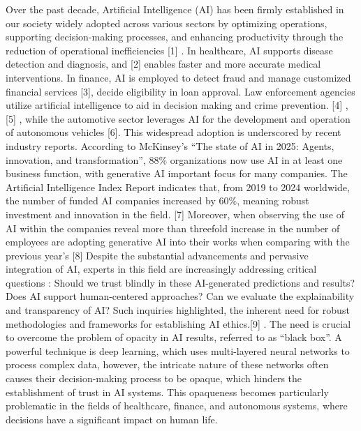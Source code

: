 Over the past decade, Artificial Intelligence (AI) has been firmly established in our society widely adopted across various sectors by optimizing operations, supporting decision-making processes, and enhancing productivity through the reduction of operational inefficiencies [1] \cite{Ali2023}. In healthcare, AI supports disease detection and diagnosis, and [2] \cite{PanForoughi2024} enables faster and more accurate medical interventions. In finance, AI is employed to detect fraud and manage customized financial services [3]\cite{OyeniyiEtAl2024}, decide eligibility in loan approval. Law enforcement agencies utilize artificial intelligence to aid in decision making and crime prevention. [4] \cite{SitumeangEtAl2024}, [5] \cite{JatnaManthovaniHasbullah2024}, while the automotive sector leverages AI for the development and operation of autonomous vehicles [6]\cite{10495655}. This widespread adoption is underscored by recent industry reports. According to McKinsey’s “The state of AI in 2025: Agents, innovation, and transformation”, 88\% organizations now use AI in at least one business function, with generative AI important focus for many companies. The Artificial Intelligence Index Report indicates that, from 2019 to 2024 worldwide, the number of funded AI companies increased by 60\%, meaning robust investment and innovation in the field. [7]\cite{McKinseySuperagency2025} Moreover, when observing the use of AI within the companies reveal more than threefold increase in the number of employees are adopting generative AI into their works when comparing with the previous year's [8] \cite{MaslejEtAl2025}Despite the substantial advancements and pervasive integration of AI, experts in this field are increasingly addressing critical questions : Should we trust blindly in these AI-generated predictions and results? Does AI support human-centered approaches? Can we evaluate the explainability and transparency of AI? Such inquiries highlighted, the inherent need for robust methodologies and frameworks for establishing AI ethics.[9] \cite{DeSilvaHalloluwaVyas2025}. The need is crucial to overcome the problem of opacity in AI results, referred to as “black box”. A powerful technique is deep learning, which uses multi-layered neural networks to process complex data, however, the intricate nature of these networks often causes their decision-making process to be opaque, which hinders the establishment of trust in AI systems. This opaqueness becomes particularly problematic in the fields of healthcare, finance, and autonomous systems, where decisions have a significant impact on human life.

